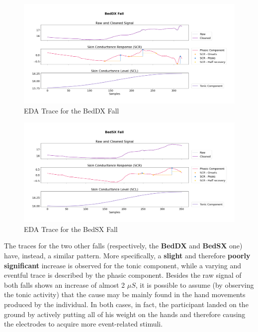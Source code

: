 \begin{figure}[h!]
    \centering
    \includegraphics[width=\textwidth]{./images/movisens/BedDX.png}
    \caption{EDA Trace for the BedDX Fall}
    \label{fig:movisens-beddx}
\end{figure}

\begin{figure}[h!]
    \centering
    \includegraphics[width=\textwidth]{./images/movisens/BedSX.png}
    \caption{EDA Trace for the BedSX Fall}
    \label{fig:movisens-bedsx}
\end{figure}

The traces for the two other falls (respectively, the \textbf{BedDX} and \textbf{BedSX} one) have, instead, a similar pattern. More specifically, a \textbf{slight} and therefore \textbf{poorly significant} increase is observed for the tonic component, while a varying and eventful trace is described by the phasic component. Besides the raw signal of both falls shows an increase of almost 2 $\mu S$, it is possible to assume (by observing the tonic activity) that the cause may be mainly found in the hand movements produced by the individual. In both cases, in fact, the participant landed on the ground by actively putting all of his weight on the hands and therefore causing the electrodes to acquire more event-related stimuli.


